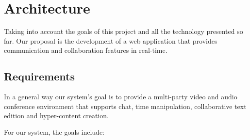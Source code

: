 \chapter{Architecture}
\label{chapter:architecture}


Taking into account the goals of this project and all the technology presented so far. Our proposal is the development of a web application that provides communication and collaboration features in real-time.

\section{Requirements}
In a general way our system's goal is to provide a multi-party video and audio conference environment that supports chat, time manipulation, collaborative text edition and hyper-content creation.


For our system, the goals include:

